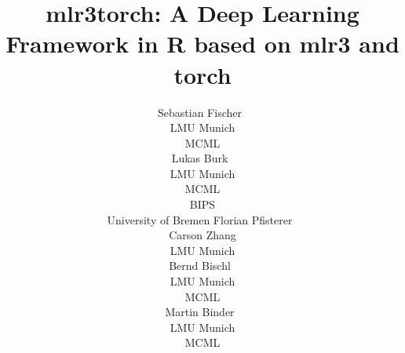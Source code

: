 \documentclass[article]{jss}
\author{Sebastian Fischer~\orcidlink{0000-0002-9609-3197} \\
    LMU Munich \\
    MCML \\
    \And Lukas Burk~\orcidlink{0000-0001-7528-3795} \\
    LMU Munich \\
    MCML\\
    BIPS \\
    University of Bremen
    \And Florian Pfisterer~\orcidlink{0000-0001-8867-762X} \\
    \AND Carson Zhang \\
    LMU Munich \\
    \And Bernd Bischl~\orcidlink{0000-0001-6002-6980} \\
    LMU Munich \\
    MCML \\
    \And Martin Binder~\orcidlink{0009-0008-2578-2869} \\
    LMU Munich \\
    MCML \\
}
\title{mlr3torch: A Deep Learning Framework in R based on mlr3 and torch}
\theoremstyle{definition}
\begin{document}
\begin{comment}

Fullfilled:

\begin{itemize}
    \item Code distributed with JSS articles uses the GNU General Public License (GPL) version 2 or version 3 or a GPL-compatible license. JSS does NOT consider software distributed under other licenses.
\end{itemize}

Final submission:

\begin{itemize}
    \item [ ] Size limit: Upload not more than 50 MB
    \item [ ] submission must contain: pdf manuscript, source code, replication materials
    \item [ ] the manuscript must be fully and exactly reproducible on at least one platform
    \item [ ] We need to provide a simplified version of the script reproducing the results that can run on a regular PC. (https://www.jstatsoft.org/authors#manuscript-preparation) -> maybe I can just run this on GitHub actions CI?
    \item [ ] to facilitate review, authors are strongly encouraged to provide an output file that shows the results from running the single standalone replication script so that this can be compared against the results presented in the manuscript. For R submissions, this should be done by providing a file “code.html” created by running knitr::spin(“code.R”) on the replication script “code.R” which should include a call to sessionInfo() at the end.
    \item [ ] Source code must be submitted in ASCII files (but need to read software preparation guidelines again after submission: https://www.jstatsoft.org/authors#manuscript-preparation)
    \item [ ] manuscript can be compiled using pdflatex
    \item [ ] Special naming for programming languages and journals (don't think it applies here)
\end{itemize}

JSS Guides:

\begin{itemize}
    \item Should read https://stats-devguide.ropensci.org/ (more as general guidance, not a requirement for packages reviewed by JSS)
    \item !!!discuss the advantages and disadvantages of the new contribution compared to existing implementations, when possible and also applicable using empirical illustrations.
    \item Page limit: not longer than 30 pages
\end{itemize}


\end{comment}
\end{document}
